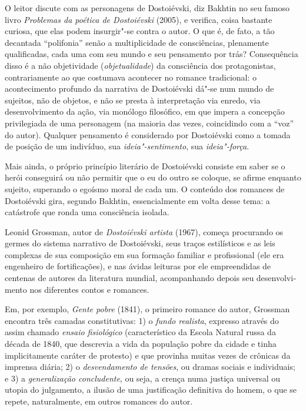 {{O leitor discute com as personagens de Dostoiévski, diz Bakhtin no seu
famoso livro \emph{Problemas da poética de Dostoiévski} (2005), e
verifica, coisa bastante curiosa, que elas podem insurgir"-se contra o
autor. O que é, de fato, a tão decantada ``polifonia'' senão a
multiplicidade de consciências, plena­mente qualificadas, cada uma com
seu mundo e seu pensamento por trás? Consequência disso é a não
objetividade (\emph{objetualidade}) da consciência dos protagonistas,
contrariamente ao que costumava acontecer no romance tradicional: o
acontecimento profundo da narrativa de Dostoiévski dá"-se num mundo de
sujeitos, não de objetos, e não se presta à interpre­tação via enredo,
via desenvolvimento da ação, via monólogo filosófico, em que impera a
concepção privilegiada de uma personagem (na maioria das vezes,
coincidindo com a ``voz'' do autor). Qualquer pensamento é considerado
por Dostoiévski como a tomada de posição de um indivíduo, sua
\emph{ideia"-sentimento}, sua \emph{ideia"-força}.

Mais ainda, o próprio princípio literário de Dostoiévski consiste em
saber se o herói conseguirá ou não permitir que o eu do outro se
coloque, se afirme enquanto sujeito, superando o egoísmo moral de cada
um. O conteúdo dos romances de Dostoiévski gira, segundo Bakhtin,
essencialmente em volta desse tema: a catástrofe que ronda uma
consciência isolada.

Leonid Grossman, autor de \emph{Dostoiévski artista} (1967), começa
procurando os germes do sistema narrativo de Dostoiévski, seus traços
estilísticos e as leis complexas de sua composição em sua formação
familiar e profissional (ele era engenheiro de fortificações), e nas
ávidas leituras por ele empreendidas de centenas de autores da
literatura mundial, acompanhando depois seu desenvolvi­mento nos
diferentes contos e romances.

Em, por exemplo, \emph{Gente pobre} (1841), o primeiro romance do autor,
Grossman encontra três camadas constitutivas: 1) o \emph{fundo
realista}, expresso através do assim chamado \emph{ensaio fisiológico}
(característico da Escola Natural russa da década de 1840, que descrevia
a vida da população pobre da cidade e tinha implicitamente caráter de
protesto) e que provi­nha muitas vezes de crônicas da imprensa diária;
2) o \emph{desvendamento de tensões}, ou dramas sociais e individuais; e
3) a \emph{generalização concludente}, ou seja, a crença numa justiça
universal ou utopia do julgamento, a ilusão de uma justificação
definitiva do homem, o que se repete, natural­mente, em outros romances
do autor.

}}
